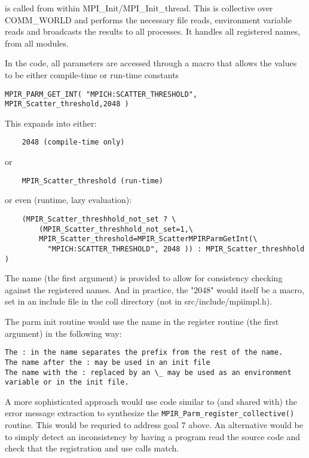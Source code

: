 \documentclass{report}
\begin{document}
is called from within MPI\_Init/MPI\_Init\_thread.  This is collective
over COMM\_WORLD and performs the 
necessary file reads, environment variable reads and broadcasts the
results to all processes.  It handles all registered names, from all
modules.

In the code, all parameters are accessed through a macro that allows
the values to be either compile-time or run-time constants

\begin{verbatim}
MPIR_PARM_GET_INT( "MPICH:SCATTER_THRESHOLD", MPIR_Scatter_threshold,2048 )
\end{verbatim}

This expands into either:
\begin{verbatim}
    2048 (compile-time only)
\end{verbatim}
or
\begin{verbatim}
    MPIR_Scatter_threshold (run-time)
\end{verbatim}
or even (runtime, lazy evaluation):
\begin{verbatim}
    (MPIR_Scatter_threshhold_not_set ? \
        (MPIR_Scatter_threshhold_not_set=1,\
        MPIR_Scatter_threshold=MPIR_ScatterMPIRParmGetInt(\
          "MPICH:SCATTER_THRESHOLD", 2048 )) : MPIR_Scatter_threshhold )
\end{verbatim}

The name (the first argument) is provided to allow for consistency
checking against the registered names.   And in practice, the "2048"
would itself be a macro, set in an include file in the coll directory
(not in src/include/mpiimpl.h).  

The parm init routine would use the name in the register routine (the
first argument) in the following way:

\begin{verbatim}
The : in the name separates the prefix from the rest of the name.
The name after the : may be used in an init file
The name with the : replaced by an \_ may be used as an environment
variable or in the init file.
\end{verbatim}

A more sophisticated approach would use code similar to (and shared
with) the error message extraction to synthesize the
\texttt{MPIR\_Parm\_register\_collective()} routine.  This would be requried to
address goal 7 above.  An alternative would be to simply detect an
inconsistency by having a program read the source code and check that
the registration and use calls match.  
\end{document}
